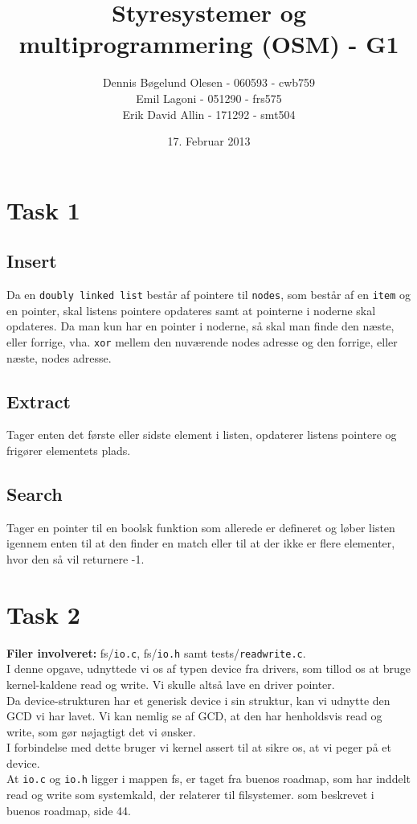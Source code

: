 \documentclass[a4paper,12pt]{article}
\title{Styresystemer og multiprogrammering (OSM) - G1}
\author{Dennis Bøgelund Olesen - 060593 - cwb759 \\ Emil Lagoni - 051290 - frs575 \\ Erik David Allin - 171292 - smt504}
\date{17. Februar 2013}
\begin{document}
\maketitle %
\thispagestyle{empty}
\setcounter{page}{0}
\newpage



\section*{Task 1}
\subsection*{Insert}
Da en \texttt{doubly linked list} består af pointere til \texttt{nodes}, som består af en \texttt{item} og en pointer, skal listens pointere opdateres samt at pointerne i noderne skal opdateres. Da man kun har en pointer i noderne, så skal man finde den næste, eller forrige, vha. \texttt{xor} mellem den nuværende nodes adresse og den forrige, eller næste, nodes adresse.
\subsection*{Extract}
Tager enten det første eller sidste element i listen, opdaterer listens pointere og frigører elementets plads.
\subsection*{Search}
Tager en pointer til en boolsk funktion som allerede er defineret og løber listen igennem enten til at den finder en match eller til at der ikke er flere elementer, hvor den så vil returnere -1.


\section*{Task 2}
\textbf{Filer involveret:} fs/\texttt{io.c}, fs/\texttt{io.h} samt tests/\texttt{readwrite.c}.
\\[5px]
I denne opgave, udnyttede vi os af typen device fra drivers, som tillod os at bruge kernel-kaldene read og write. Vi skulle altså lave en driver pointer. 
\\
Da device-strukturen har et generisk device i sin struktur, kan vi udnytte den GCD vi har lavet. Vi kan nemlig se af GCD, at den har henholdsvis read og write, som gør nøjagtigt det vi ønsker. 
\\
I forbindelse med dette bruger vi kernel assert til at sikre os, at vi peger på et device.
\\
At \texttt{io.c} og \texttt{io.h} ligger i mappen fs, er taget fra buenos roadmap, som har inddelt read og write som systemkald, der relaterer til filsystemer. som beskrevet i buenos roadmap, side 44. 
\\
\end{document}

